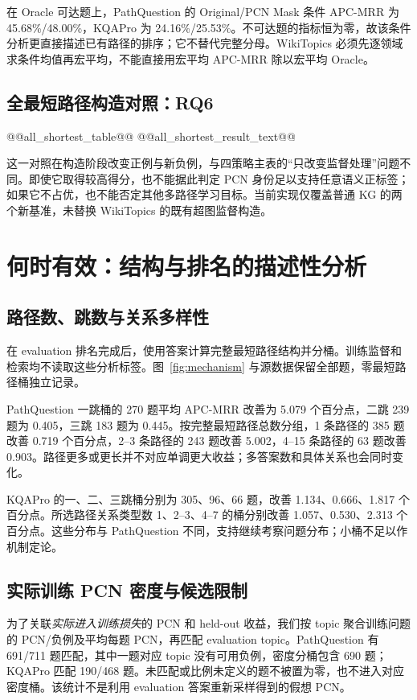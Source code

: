 \documentclass[UTF8,a4paper,10pt,fontset=fandol]{ctexart}
\begin{document}
在 Oracle 可达题上，PathQuestion 的 Original/PCN Mask 条件 APC-MRR 为 45.68\%/48.00\%，KQAPro 为 24.16\%/25.53\%。不可达题的指标恒为零，故该条件分析更直接描述已有路径的排序；它不替代完整分母。WikiTopics 必须先逐领域求条件均值再宏平均，不能直接用宏平均 APC-MRR 除以宏平均 Oracle。

\subsection{全最短路径构造对照：RQ6}
@@all_shortest_table@@
@@all_shortest_result_text@@

这一对照在构造阶段改变正例与新负例，与四策略主表的“只改变监督处理”问题不同。即使它取得较高得分，也不能据此判定 PCN 身份足以支持任意语义正标签；如果它不占优，也不能否定其他多路径学习目标。当前实现仅覆盖普通 KG 的两个新基准，未替换 WikiTopics 的既有超图监督构造。

\section{何时有效：结构与排名的描述性分析}
\subsection{路径数、跳数与关系多样性}
在 evaluation 排名完成后，使用答案计算完整最短路径结构并分桶。训练监督和检索均不读取这些分析标签。图~\ref{fig:mechanism} 与源数据保留全部题，零最短路径桶独立记录。

PathQuestion 一跳桶的 270 题平均 APC-MRR 改善为 5.079 个百分点，二跳 239 题为 0.405，三跳 183 题为 0.445。按完整最短路径总数分组，1 条路径的 385 题改善 0.719 个百分点，2--3 条路径的 243 题改善 5.002，4--15 条路径的 63 题改善 0.903。路径更多或更长并不对应单调更大收益；多答案数和具体关系也会同时变化。

KQAPro 的一、二、三跳桶分别为 305、96、66 题，改善 1.134、0.666、1.817 个百分点。所选路径关系类型数 1、2--3、4--7 的桶分别改善 1.057、0.530、2.313 个百分点。这些分布与 PathQuestion 不同，支持继续考察问题分布；小桶不足以作机制定论。

\subsection{实际训练 PCN 密度与候选限制}
为了关联\emph{实际进入训练损失}的 PCN 和 held-out 收益，我们按 topic 聚合训练问题的 PCN/负例及平均每题 PCN，再匹配 evaluation topic。PathQuestion 有 691/711 题匹配，其中一题对应 topic 没有可用负例，密度分桶包含 690 题；KQAPro 匹配 190/468 题。未匹配或比例未定义的题不被置为零，也不进入对应密度桶。该统计不是利用 evaluation 答案重新采样得到的假想 PCN。
\end{document}
